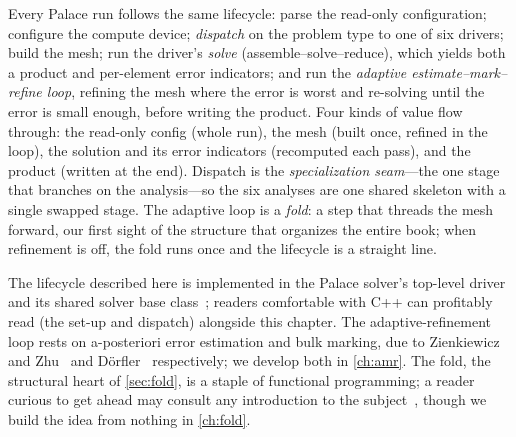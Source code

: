 \summarysection
Every Palace run follows the same lifecycle: parse the read-only configuration;
configure the compute device; \emph{dispatch} on the problem type to one of six
drivers; build the mesh; run the driver's \emph{solve} (assemble--solve--reduce),
which yields both a product and per-element error indicators; and run the
\emph{adaptive estimate--mark--refine loop}, refining the mesh where the error is
worst and re-solving until the error is small enough, before writing the product.
Four kinds of value flow through: the read-only config (whole run), the mesh
(built once, refined in the loop), the solution and its error indicators
(recomputed each pass), and the product (written at the end). Dispatch is the
\emph{specialization seam}---the one stage that branches on the analysis---so the
six analyses are one shared skeleton with a single swapped stage. The adaptive
loop is a \emph{fold}: a step that threads the mesh forward, our first sight of
the structure that organizes the entire book; when refinement is off, the fold
runs once and the lifecycle is a straight line.

\furtherreading
The lifecycle described here is implemented in the Palace solver's top-level
driver and its shared solver base class~\citep{palace2023}; readers comfortable
with C++ can profitably read  (the set-up and dispatch) alongside
this chapter. The adaptive-refinement loop rests on a-posteriori error estimation
and bulk marking, due to Zienkiewicz and Zhu~\citep{zienkiewiczzhu1987} and
D\"orfler~\citep{dorfler1996} respectively; we develop both in \cref{ch:amr}. The
fold, the structural heart of \cref{sec:fold}, is a staple of functional
programming; a reader curious to get ahead may consult any introduction to the
subject~\citep{peytonjones2003}, though we build the idea from nothing in
\cref{ch:fold}.

